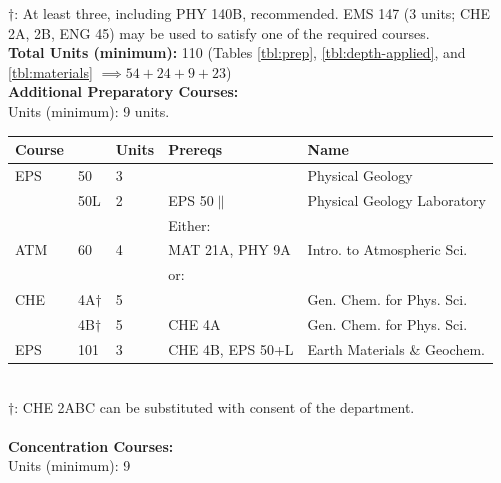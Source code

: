 \documentclass[12pt]{article}
\begin{document}
\noindent
$\dagger$: At least three, including PHY 140B, recommended.  EMS 147 (3 units; CHE 2A, 2B, ENG 45) may be used to satisfy one of the required courses.\\
{\bf Total Units (minimum):} 110 (Tables \ref{tbl:prep}, \ref{tbl:depth-applied}, and \ref{tbl:materials} $\implies 54+24+9+23$) \\



\newpage
{}
\vskip 0.25cm
\noindent
{\bf Additional Preparatory Courses:  }\\
Units (minimum): 9 units.\\
\begin{tabular}{|lllll|}
\hline
Course & & Units & Prereqs & Name \\
\hline
EPS & 50   & 3 & & Physical Geology \\
          & 50L  & 2 & EPS 50$\parallel$ & Physical Geology Laboratory\\
\hline
\hline
& & & Either: & \\
ATM & 60       & 4 & MAT 21A, PHY 9A & Intro. to Atmospheric Sci. \\
\hline
& & & or: & \\
CHE & 4A$\dagger$ & 5 &            & Gen. Chem. for Phys. Sci. \\
    & 4B$\dagger$ & 5 & CHE 4A & Gen. Chem. for Phys. Sci. \\
EPS & 101          & 3 & CHE 4B, EPS 50+L & Earth Materials \& Geochem.\\
\hline
\end{tabular}\\
$\dagger$: CHE 2ABC can be substituted with consent of the department.\\
~\\[-8pt]
\noindent
{\bf Concentration Courses:  }\\
Units (minimum):  9\\
\end{document}
